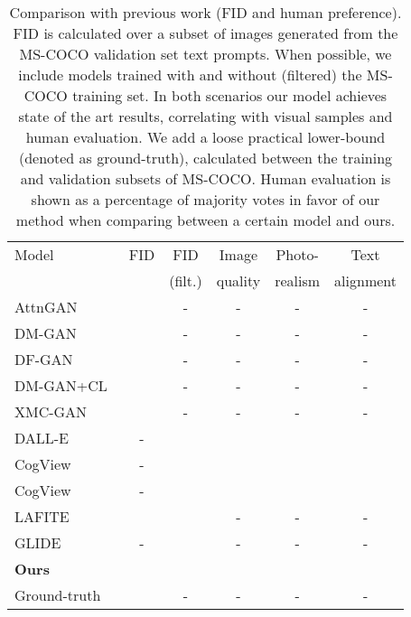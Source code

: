 \documentclass[final]{cvpr}
\begin{document}
\setlength{\tabcolsep}{1.5pt}
\begin{table}
\begin{center}
\label{table:prev_work}
\begin{tabular}{l|cc|ccc}
\hline\noalign{\smallskip}
Model & FID & FID & Image & Photo- & Text \\
& & (filt.) & quality & realism & alignment  \\
\noalign{\smallskip}
\hline
\noalign{\smallskip}
AttnGAN~\cite{xu2018attngan}  &  & - & - & - & - \\
DM-GAN~\cite{zhu2019dm} &  & - & - & - & - \\
DF-GAN~\cite{tao2020df} &  & - & - & - & - \\
DM-GAN+CL~\cite{ye2021improving} &  & - & - & - & -\\
XMC-GAN~\cite{zhang2021cross} &  & - & - & - & -\\
DALL-E~\cite{ramesh2021zero} & - &  &  &  &  \\
CogView~\cite{ding2021cogview} & - &   &  &  & \\
CogView~\cite{ding2021cogview} & - &  &   &  &  \\
LAFITE~\cite{zhou2021lafite} &  &  & - & - & - \\
GLIDE~\cite{nichol2021glide} & - &  & - &  - & - \\
\bf{Ours} & {} &  \\
\hline
Ground-truth &  & - & - & - & - \\
\hline
\end{tabular}
\vspace{0.2cm}
\caption{Comparison with previous work (FID and human preference). FID is calculated over a subset of  images generated from the MS-COCO validation set text prompts. When possible, we include models trained with and without (filtered) the MS-COCO training set. In both scenarios our model achieves state of the art results, correlating with visual samples and human evaluation. We add a loose practical lower-bound (denoted as ground-truth), calculated between the training and validation subsets of MS-COCO. Human evaluation is shown as a percentage of majority votes in favor of our method when comparing between a certain model and ours.}
\end{center}
\end{table}
\setlength{\tabcolsep}{1.4pt}
\end{document}
